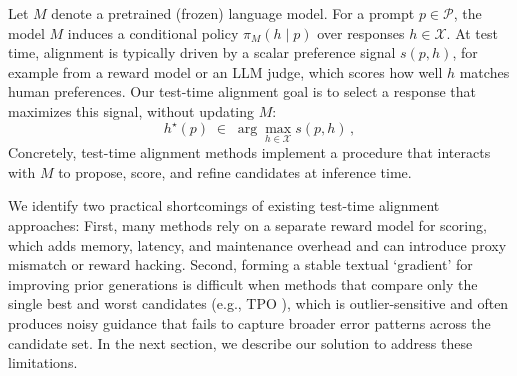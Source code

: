 \documentclass{article}
\theoremstyle{plain}
\theoremstyle{definition}
\theoremstyle{remark}
\newcommand{\budget}{B}
\newcommand{\batchN}{N}
\begin{document}

Let \(M\) denote a pretrained (frozen) language model. For a prompt \(p\in\mathcal{P}\), the model \(M\) induces a conditional policy \(\pi_{M}(h\mid p)\) over responses \(h\in\mathcal{X}\). At test time, alignment is typically driven by a scalar preference signal \(s(p,h)\), for example from a reward model or an LLM judge, which scores how well \(h\) matches human preferences. Our test-time alignment goal is to select a response that maximizes this signal, without updating \(M\):
\[
    h^\star(p)\;\in\;\arg\max_{h\in\mathcal{X}} s(p,h)\,,
\]
Concretely, test-time alignment methods implement a procedure that interacts with \(M\) to propose, score, and refine candidates at inference time.


We identify two practical shortcomings of existing test-time alignment approaches: First, many methods rely on a separate reward model for scoring, which adds memory, latency, and maintenance overhead and can introduce proxy mismatch or reward hacking. Second, forming a stable textual `gradient' for improving prior generations is difficult when methods that compare only the single best and worst candidates (e.g., TPO \cite{litest}), which is outlier‑sensitive and often produces noisy guidance that fails to capture broader error patterns across the candidate set. In the next section, we describe our solution to address these limitations.
\end{document}
